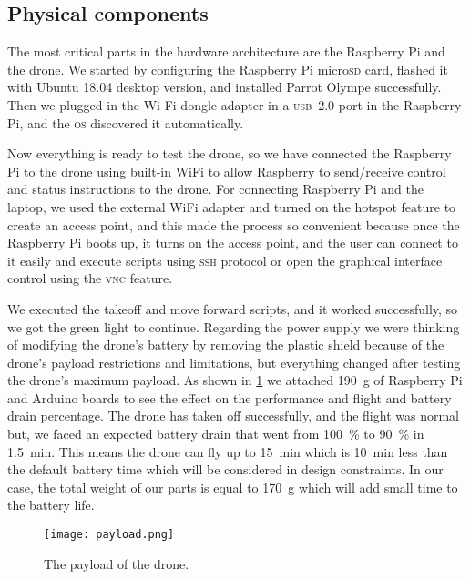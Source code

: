 \documentclass[../main.tex]{subfiles}
\begin{document}
\subsection{Physical components}

The most critical parts in the hardware
architecture are the Raspberry Pi and the drone. 
We started by configuring the Raspberry Pi micro\textsc{sd} card,
flashed it with Ubuntu 18.04 desktop version,
and installed Parrot Olympe successfully. 
Then we plugged in the Wi-Fi dongle adapter
in a \textsc{usb}~2.0 port in the Raspberry Pi, 
and the \textsc{os} discovered it automatically. 

Now everything is ready to test the 
\anafi drone, so we have connected the
Raspberry Pi to the drone using built-in WiFi
to allow Raspberry to send/receive control and status 
instructions to the drone. 
For connecting Raspberry Pi and the laptop, 
we used the external WiFi adapter and turned 
on the hotspot feature to create an access point,
and this made the process so convenient because 
once the Raspberry Pi boots up, it turns on the 
access point, and the user can connect to it 
easily and execute scripts using \textsc{ssh} 
protocol or open the graphical interface 
control using the \textsc{vnc} feature.

We executed the takeoff and move forward scripts,
and it worked successfully, so we got the green 
light to continue. 
Regarding the power supply we were thinking 
of modifying the drone's battery by removing the 
plastic shield because of the drone's payload restrictions 
and limitations, but everything changed after testing 
the drone's maximum payload. As shown in \cref{fig:payload}
we attached \SI{190}{\gram} of Raspberry Pi and Arduino boards
to see the effect on the performance and flight and
battery drain percentage. 
The drone has taken off  successfully, 
and the flight was normal but, we faced an expected 
battery drain that went from 
\SI{100}{\percent} to \SI{90}{\percent} in 
\SI{1.5}{\minute}.
This means the drone can fly up to 
\SI{15}{\minute} which is \SI{10}{\minute} 
less than the default battery time 
which will be considered in design constraints.
In our case, the total weight of our parts is equal
to \SI{170}{\gram} which will add small time
to the battery life.

\begin{figure}[bp]
	\centering
	\texttt{[image: payload.png]}
	\caption{The payload of the drone.}
	\label{fig:payload}
\end{figure} 
\end{document}

